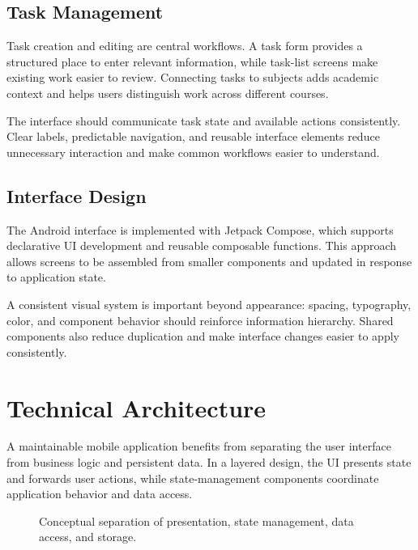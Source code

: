 \documentclass[10pt,a4paper,twocolumn]{article}
\begin{document}
\subsection{Task Management}

Task creation and editing are central workflows. A task form provides
a structured place to enter relevant information, while task-list
screens make existing work easier to review. Connecting tasks to
subjects adds academic context and helps users distinguish work across
different courses.

The interface should communicate task state and available actions
consistently. Clear labels, predictable navigation, and reusable
interface elements reduce unnecessary interaction and make common
workflows easier to understand.

\subsection{Interface Design}

The Android interface is implemented with Jetpack Compose, which
supports declarative UI development and reusable composable functions.
This approach allows screens to be assembled from smaller components
and updated in response to application state.

A consistent visual system is important beyond appearance: spacing,
typography, color, and component behavior should reinforce information
hierarchy. Shared components also reduce duplication and make interface
changes easier to apply consistently.

\section{Technical Architecture}

A maintainable mobile application benefits from separating the user
interface from business logic and persistent data. In a layered design,
the UI presents state and forwards user actions, while state-management
components coordinate application behavior and data access.

\begin{figure}[t]
\centering
{}
\caption{Conceptual separation of presentation, state management,
data access, and storage.}
\label{fig:architecture}
\end{figure}
\end{document}
